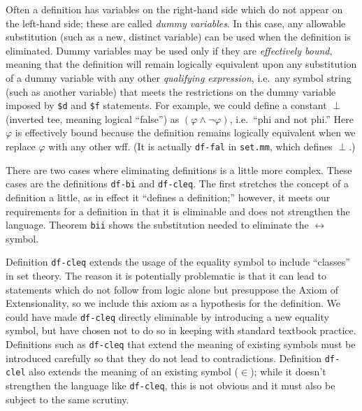 Often a definition has variables on the right-hand side which do not appear on
the left-hand side; these are called {\em dummy variables}.  In this case, any
allowable substitution (such as a new, distinct
variable) can be used when the definition is eliminated.  Dummy variables may
be used only if they are {\em effectively bound}, meaning that the definition will remain logically equivalent upon
any substitution of a dummy variable with any other {\em qualifying
expression}, i.e.\ any symbol string (such as
another variable) that
meets the restrictions on the dummy variable imposed by \texttt{\$d} and
\texttt{\$f} statements.  For example, we could define a constant $\perp$
(inverted tee, meaning logical ``false'') as $( \varphi \wedge \lnot \varphi
)$, i.e.\ ``phi and not phi.''  Here $\varphi$ is effectively bound because the
definition remains logically equivalent when we replace $\varphi$ with any
other wff.  (It is actually \texttt{df-fal}
in \texttt{set.mm}, which defines $\perp$.)

There are two cases where eliminating definitions is a little more
complex.  These cases are the definitions \texttt{df-bi} and
\texttt{df-cleq}.  The first stretches the concept of a definition a
little, as in effect it ``defines a definition;'' however, it meets our
requirements for a definition in that it is eliminable and does not
strengthen the language.  Theorem \texttt{bii} shows the substitution
needed to eliminate the $\leftrightarrow$ symbol.

Definition \texttt{df-cleq} extends the usage of
the equality symbol to include ``classes'' in set theory.  The
reason it is potentially problematic is that it can lead to statements which
do not follow from logic alone but presuppose the Axiom of
Extensionality, so we include this axiom
as a hypothesis for the definition.  We could have made \texttt{df-cleq} directly
eliminable by introducing a new equality symbol, but have chosen not to do so
in keeping with standard textbook practice.  Definitions such as \texttt{df-cleq}
that extend the meaning of existing symbols must be introduced carefully so
that they do not lead to contradictions.  Definition \texttt{df-clel} also
extends the meaning of an existing symbol ($\in$); while it doesn't strengthen
the language like \texttt{df-cleq}, this is not obvious and it must also be
subject to the same scrutiny.

